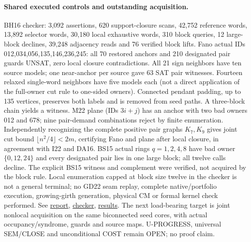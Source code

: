 \documentclass[11pt]{article}
\begin{document}
\paragraph{Shared executed controls and outstanding acquisition.}
BH16 checker: 3,092 assertions, 620 support-closure scans, 42,752 reference words, 13,892 selector words, 30,180 local exhaustive words, 310 block queries, 12 large-block declines, 39,248 adjacency reads and 76 verified block lifts. Fano actual IDs 012,034,056,135,146,236,245: all 70 restored anchors and 210 designated pair guards UNSAT, zero local closure contradictions. All 21 sign neighbors have ten source models; one near-anchor per source gave 63 SAT pair witnesses. Fourteen relaxed single-word neighbors have five models each (not a direct application of the full-owner cut rule to one-sided owners). Connected pendant padding, up to 135 vertices, preserves both labels and is removed from seed paths. A three-block chain yields a witness. M22 plane (IDs $3i+j$) has an anchor with two bad owners 012 and 678; nine pair-demand combinations reject by finite enumeration. Independently recognizing the complete positive pair graphs $K_7,K_9$ gives joint cut bound $\lfloor n^2/4\rfloor<2m$, certifying Fano and plane after local closure, in agreement with I22 and DA16. BS15 actual rings $q=1,2,4,8$ have bad owner $\{0,12,24\}$ and every designated pair lies in one large block; all twelve calls decline. The explicit BS15 witness and complement were verified, not acquired by the block rule. Local enumeration capped at block size twelve in the checker is not a general terminal; no GD22 seam replay, complete native/portfolio execution, growing-girth generation, physical CM or formal kernel check performed. See \href{https://github.com/j15marti/pnp/commit/5218c59ab4631861a5755733030e59bc0957e5c4}{report}, \href{https://github.com/j15marti/pnp/commit/652f1f30a4913195254ba4576a86cb7d9d0c1ca5}{checker}, \href{https://github.com/j15marti/pnp/commit/528b3ec7734cae119d520e4c4fb1e1b51992fd1d}{results}.
The next load-bearing target is joint nonlocal acquisition on the same biconnected seed cores, with actual occupancy/syndrome, guards and source maps. U-PROGRESS, universal SEM/CLOSE and unconditional COST remain OPEN; no proof claim.
\end{document}
